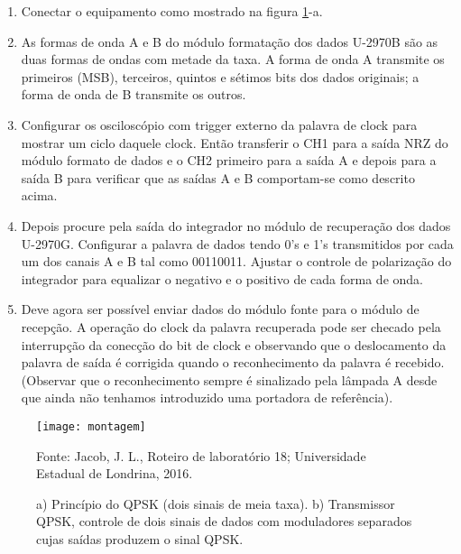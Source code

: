             \begin{enumerate}
                \item Conectar o equipamento como mostrado na figura \ref{fig:montagem}-a.
                
                \item As formas de onda A e B do módulo formatação dos dados U-2970B são as duas formas de ondas com metade da taxa. A forma de onda A transmite os primeiros (MSB), terceiros, quintos e sétimos bits dos dados originais; a forma de onda de B transmite os outros.
                
                \item Configurar os osciloscópio com trigger externo da palavra de clock para mostrar um ciclo daquele clock. Então transferir o CH1 para a saída NRZ do módulo formato de dados e o CH2 primeiro para a saída A e depois para a saída B para verificar que as saídas A e B comportam-se como descrito acima.
                
                \item Depois procure pela saída do integrador no módulo de recuperação dos dados U-2970G. Configurar a palavra de dados tendo 0’s e 1’s transmitidos por cada um dos canais A e B tal
                como 00110011. Ajustar o controle de polarização do integrador para equalizar o negativo e o positivo de cada forma de onda.
                
                \item Deve agora ser possível enviar dados do módulo fonte para o módulo de recepção. A operação do clock da palavra recuperada pode ser checado pela interrupção da conecção do bit de clock
                e observando que o deslocamento da palavra de saída é corrigida quando o reconhecimento da palavra é recebido. (Observar que o reconhecimento sempre é sinalizado pela lâmpada A desde que ainda não tenhamos introduzido uma portadora de referência).
            \end{enumerate}
    
                 \begin{figure}[H]
                   \centering
                   \caption{a) Princípio do QPSK (dois sinais de meia taxa). b) Transmissor QPSK, controle de dois sinais de dados com moduladores separados cujas saídas produzem o sinal QPSK.}
                   \texttt{[image: montagem]}
                   
                   \small Fonte: Jacob, J. L., Roteiro de laboratório 18; Universidade Estadual de Londrina, 2016.
                   \label{fig:montagem}
                  \end{figure}
                  
